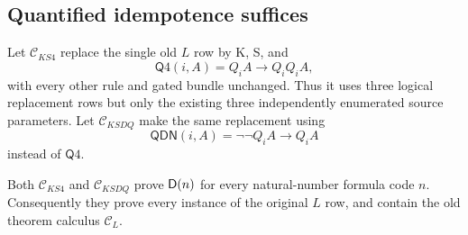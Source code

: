 \subsection{Quantified idempotence suffices}

Let $\mathcal C_{KS4}$ replace the single old $L$ row by K, S, and
\[
 \mathsf Q4(i,A)=Q_iA\to Q_iQ_iA,
\]
with every other rule and gated bundle unchanged. Thus it uses three
logical replacement rows but only the existing three independently
enumerated source parameters. Let $\mathcal C_{KSDQ}$ make the same
replacement using
\[
 \mathsf{QDN}(i,A)=\neg\neg Q_iA\to Q_iA
\]
instead of $\mathsf Q4$.

\begin{theorem}
\label{thm:ksquant}
Both $\mathcal C_{KS4}$ and $\mathcal C_{KSDQ}$ prove $\mathsf{D}(n)$ for every
natural-number formula code $n$. Consequently they prove every instance
of the original $L$ row, and contain the old theorem calculus
$\mathcal C_L$.
\end{theorem}
